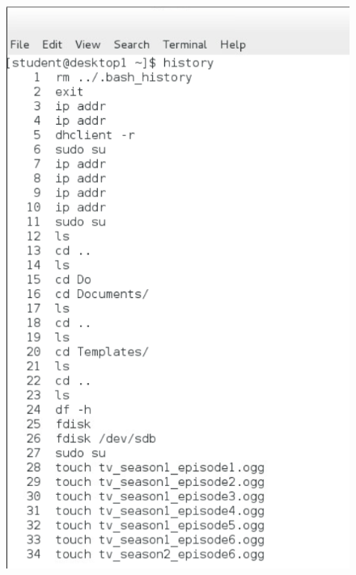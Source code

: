 \documentclass[../CIT217_RHEL124_LabJournal.tex]{subfiles}
\begin{document}
\begin{figure}[!hbt]
\begin{minipage}[c]{0.4\linewidth}
  \centering
	\includegraphics[scale=0.25]{Figures/2020-02-01-174110_541x885_scrot.png}
	\label{Hist1}
\end{minipage}\hfill
%
\begin{minipage}[c]{0.4\linewidth}
  \centering

\end{minipage}
\end{figure}
\end{document}
